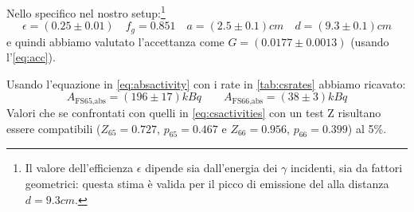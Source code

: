 Nello specifico nel nostro setup:\footnote{Il valore dell'efficienza $\epsilon$ dipende sia dall'energia dei $\gamma$ incidenti, sia da fattori geometrici: questa stima è valida per il picco di emissione del  alla distanza $ d = 9.3 \unit{cm} $.}
\begin{equation}
\epsilon = (0.25 \pm 0.01) \quad f_g = 0.851 \quad a = (2.5 \pm 0.1) \unit{cm} \quad d = (9.3 \pm 0.1) \unit{cm}
\end{equation}
e quindi abbiamo valutato l'accettanza come $ G = (0.0177 \pm 0.0013)$ (usando l'\cref{eq:acc}).

Usando l'equazione in \cref{eq:absactivity} con i rate in \cref{tab:csrates} abbiamo ricavato:
\begin{equation}
A_\text{FS65,abs} = (196 \pm 17) \unit{kBq} \qquad A_\text{FS66,abs} = (38\pm3) \unit{kBq}
\end{equation}
Valori che se confrontati con quelli in \cref{eq:csactivities} con un test Z risultano essere compatibili ($Z_{65} = 0.727$, $ p_{65} = 0.467$ e $Z_{66} = 0.956$, $ p_{66} = 0.399$) al 5\%.  
